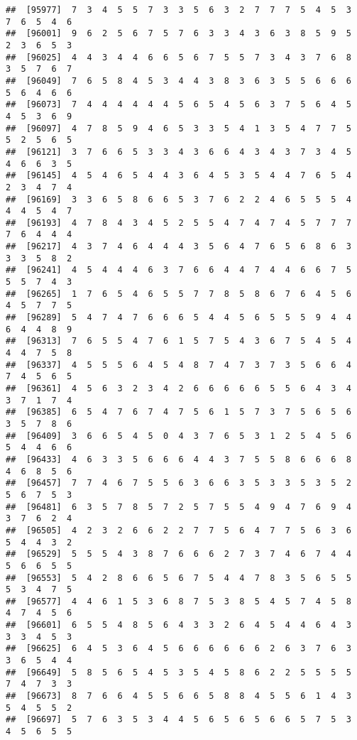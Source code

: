 \documentclass[
]{book}
\begin{document}
\begin{verbatim}
##  [95977]  7  3  4  5  5  7  3  3  5  6  3  2  7  7  7  5  4  5  3  7  6  5  4  6
##  [96001]  9  6  2  5  6  7  5  7  6  3  3  4  3  6  3  8  5  9  5  2  3  6  5  3
##  [96025]  4  4  3  4  4  6  6  5  6  7  5  5  7  3  4  3  7  6  8  3  5  7  6  7
##  [96049]  7  6  5  8  4  5  3  4  4  3  8  3  6  3  5  5  6  6  6  5  6  4  6  6
##  [96073]  7  4  4  4  4  4  4  5  6  5  4  5  6  3  7  5  6  4  5  4  5  3  6  9
##  [96097]  4  7  8  5  9  4  6  5  3  3  5  4  1  3  5  4  7  7  5  5  2  5  6  5
##  [96121]  3  7  6  6  5  3  3  4  3  6  6  4  3  4  3  7  3  4  5  4  6  6  3  5
##  [96145]  4  5  4  6  5  4  4  3  6  4  5  3  5  4  4  7  6  5  4  2  3  4  7  4
##  [96169]  3  3  6  5  8  6  6  5  3  7  6  2  2  4  6  5  5  5  4  4  4  5  4  7
##  [96193]  4  7  8  4  3  4  5  2  5  5  4  7  4  7  4  5  7  7  7  7  6  4  4  4
##  [96217]  4  3  7  4  6  4  4  4  3  5  6  4  7  6  5  6  8  6  3  3  3  5  8  2
##  [96241]  4  5  4  4  4  6  3  7  6  6  4  4  7  4  4  6  6  7  5  5  5  7  4  3
##  [96265]  1  7  6  5  4  6  5  5  7  7  8  5  8  6  7  6  4  5  6  4  5  7  7  5
##  [96289]  5  4  7  4  7  6  6  6  5  4  4  5  6  5  5  5  9  4  4  6  4  4  8  9
##  [96313]  7  6  5  5  4  7  6  1  5  7  5  4  3  6  7  5  4  5  4  4  4  7  5  8
##  [96337]  4  5  5  5  6  4  5  4  8  7  4  7  3  7  3  5  6  6  4  7  4  5  6  5
##  [96361]  4  5  6  3  2  3  4  2  6  6  6  6  6  5  5  6  4  3  4  3  7  1  7  4
##  [96385]  6  5  4  7  6  7  4  7  5  6  1  5  7  3  7  5  6  5  6  3  5  7  8  6
##  [96409]  3  6  6  5  4  5  0  4  3  7  6  5  3  1  2  5  4  5  6  5  4  4  6  6
##  [96433]  4  6  3  3  5  6  6  6  4  4  3  7  5  5  8  6  6  6  8  4  6  8  5  6
##  [96457]  7  7  4  6  7  5  5  6  3  6  6  3  5  3  3  5  3  5  2  5  6  7  5  3
##  [96481]  6  3  5  7  8  5  7  2  5  7  5  5  4  9  4  7  6  9  4  3  7  6  2  4
##  [96505]  4  2  3  2  6  6  2  2  7  7  5  6  4  7  7  5  6  3  6  5  4  4  3  2
##  [96529]  5  5  5  4  3  8  7  6  6  6  2  7  3  7  4  6  7  4  4  5  6  6  5  5
##  [96553]  5  4  2  8  6  6  5  6  7  5  4  4  7  8  3  5  6  5  5  5  3  4  7  5
##  [96577]  4  4  6  1  5  3  6  8  7  5  3  8  5  4  5  7  4  5  8  4  7  4  5  6
##  [96601]  6  5  5  4  8  5  6  4  3  3  2  6  4  5  4  4  6  4  3  3  3  4  5  3
##  [96625]  6  4  5  3  6  4  5  6  6  6  6  6  6  2  6  3  7  6  3  3  6  5  4  4
##  [96649]  5  8  5  6  5  4  5  3  5  4  5  8  6  2  2  5  5  5  5  7  4  7  3  3
##  [96673]  8  7  6  6  4  5  5  6  6  5  8  8  4  5  5  6  1  4  3  5  4  5  5  2
##  [96697]  5  7  6  3  5  3  4  4  5  6  5  6  5  6  6  5  7  5  3  4  5  6  5  5

\end{verbatim}
\end{document}
